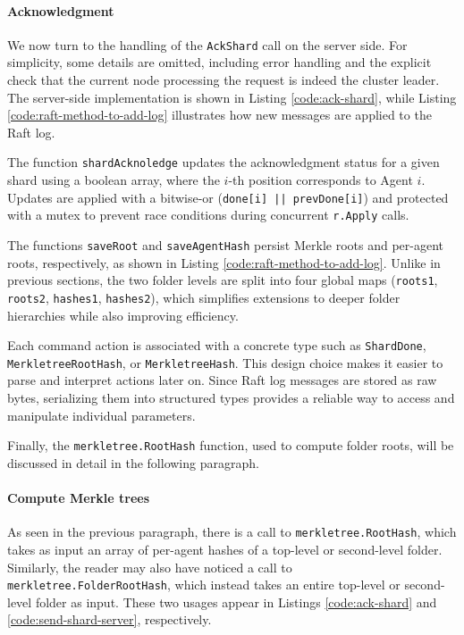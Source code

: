\paragraph{Acknowledgment}

We now turn to the handling of the \texttt{AckShard} call on the server side. For simplicity, some details are omitted, including error handling and the explicit check that the current node processing the request is indeed the cluster leader. The server-side implementation is shown in Listing \ref{code:ack-shard}, while Listing \ref{code:raft-method-to-add-log} illustrates how new messages are applied to the Raft log.

The function \texttt{shardAcknoledge} updates the acknowledgment status for a
given shard using a boolean array, where the $i$-th position corresponds to
Agent $i$. Updates are applied with a bitwise-or (\texttt{done[i] || prevDone[i]}) and protected with a mutex to prevent race conditions during concurrent \texttt{r.Apply} calls.

The functions \texttt{saveRoot} and \texttt{saveAgentHash} persist Merkle roots and per-agent roots, respectively, as shown in Listing \ref{code:raft-method-to-add-log}. Unlike in previous sections, the two folder levels are split into four global maps (\texttt{roots1}, \texttt{roots2}, \texttt{hashes1}, \texttt{hashes2}), which simplifies extensions to deeper folder hierarchies while also improving efficiency.

Each command action is associated with a concrete type such as \texttt{ShardDone}, \texttt{MerkletreeRootHash}, or \texttt{MerkletreeHash}. This design choice makes it easier to parse and interpret actions later on. Since Raft log messages are stored as raw bytes, serializing them into structured types provides a reliable way to access and manipulate individual parameters.

Finally, the \texttt{merkletree.RootHash} function, used to compute folder roots, will be discussed in detail in the following paragraph.

\paragraph{Compute Merkle trees}

As seen in the previous paragraph, there is a call to \texttt{merkletree.RootHash}, which
takes as input an array of per-agent hashes of a top-level or second-level folder. 
Similarly, the reader may also have noticed a call to 
\texttt{merkletree.FolderRootHash}, which instead takes an entire top-level or second-level
folder as input. These two usages appear in Listings \ref{code:ack-shard} and
\ref{code:send-shard-server}, respectively.  

